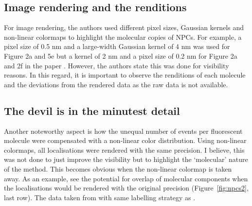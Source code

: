 \documentclass[9pt,twocolumn,twoside]{pnas-new}
\begin{document}
\subsection{Image rendering and the renditions}
For image rendering, the authors used different pixel sizes, Gaussian kernels and non-linear colormaps to highlight the molecular copies of NPCs. For example, a pixel size of 0.5 nm and a large-width Gaussian kernel of 4 nm was used for Figure 2a and 5e but a kernel of 2 nm and a pixel size of 0.2 nm for Figure 2a and 2f in the paper \citep{gwosch2020minflux}. However, the authors state this was done for visibility reasons. In this regard, it is important to observe the renditions of each molecule and the deviations from the rendered data as the raw data is not available. 

\subsection{The devil is in the minutest detail}
Another noteworthy aspect is how the unequal number of events per fluorescent molecule were compensated with a non-linear color distribution. Using non-linear colormaps, all localisations were rendered with the same precision. I believe, this was not done to just improve the visibility but to highlight the `molecular' nature of the method. This becomes obvious when the non-linear colormap is taken away. As an example, see the potential for overlap of molecular components when the localisations would be rendered with the original precision (Figure~\ref{fig:npcs2}, last row). The data taken from \cite{thevathasan2019nuclear} with same labelling strategy as \cite{gwosch2020minflux}. 
\end{document}
